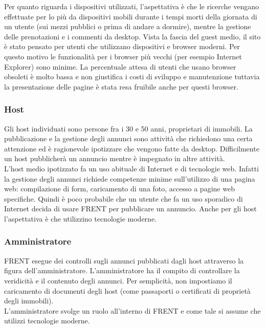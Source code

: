 \documentclass[1_relazione.tex]{subfiles}
\begin{document}
Per quanto riguarda i dispositivi utilizzati, l'aspettativa è che le ricerche vengano effettuate per lo più da dispositivi mobili durante i tempi morti della giornata di un utente (sui mezzi pubblici o prima di andare a dormire), mentre la gestione delle prenotazioni e i commenti da desktop. 
Vista la fascia del guest medio, il sito è stato pensato per utenti che utilizzano dispositivi e browser moderni. 
Per questo motivo le funzionalità per i browser più vecchi (per esempio Internet Explorer) sono minime. La percentuale attesa di utenti che usano browser obsoleti è molto bassa e non giustifica i costi di sviluppo e manutenzione tuttavia la presentazione delle pagine è stata resa fruibile anche per questi browser.

\subsubsection{Host}
Gli host individuati sono persone fra i 30 e 50 anni, proprietari di immobili. La pubblicazione e la gestione degli annunci sono attività che richiedono una certa attenzione ed è ragionevole ipotizzare che vengono fatte da desktop. Difficilmente un host pubblicherà un annuncio mentre è impegnato in altre attività. \\
L'host medio ipotizzato fa un uso abituale di Internet e di tecnologie web. Infatti la gestione degli annunci richiede competenze minime sull'utilizzo di una pagina web: compilazione di form, caricamento di una foto, accesso a pagine web specifiche. Quindi è poco probabile che un utente che fa un uso sporadico di Internet decida di usare FRENT per pubblicare un annuncio.
Anche per gli host l'aspettativa è che utilizzino tecnologie moderne.


\subsubsection{Amministratore}
FRENT esegue dei controlli sugli annunci pubblicati dagli host attraverso la figura dell'amministratore. L'amministratore ha il compito di controllare la veridicità e il contenuto degli annunci.  Per semplicità, non impostiamo il caricamento di documenti degli host (come passaporti o certificati di proprietà degli immobili). \\
L'amministratore svolge un ruolo all'interno di FRENT e come tale si assume che utilizzi tecnologie moderne.   
\end{document}
